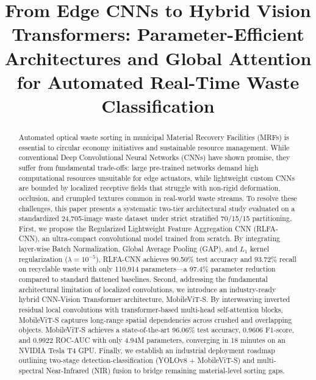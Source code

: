 \documentclass[conference]{IEEEtran}
\begin{document}
\title{From Edge CNNs to Hybrid Vision Transformers: Parameter-Efficient Architectures and Global Attention for Automated Real-Time Waste Classification\\
}

\author{
}

\maketitle

\begin{abstract}
Automated optical waste sorting in municipal Material Recovery Facilities (MRFs) is essential to circular economy initiatives and sustainable resource management. While conventional Deep Convolutional Neural Networks (CNNs) have shown promise, they suffer from fundamental trade-offs: large pre-trained networks demand high computational resources unsuitable for edge actuators, while lightweight custom CNNs are bounded by localized receptive fields that struggle with non-rigid deformation, occlusion, and crumpled textures common in real-world waste streams. To resolve these challenges, this paper presents a systematic two-tier architectural study evaluated on a standardized 24,705-image waste dataset under strict stratified 70/15/15 partitioning. First, we propose the Regularized Lightweight Feature Aggregation CNN (RLFA-CNN), an ultra-compact convolutional model trained from scratch. By integrating layer-wise Batch Normalization, Global Average Pooling (GAP), and $L_1$ kernel regularization ($\lambda = 10^{-5}$), RLFA-CNN achieves 90.50\% test accuracy and 93.72\% recall on recyclable waste with only 110,914 parameters---a 97.4\% parameter reduction compared to standard flattened baselines. Second, addressing the fundamental architectural limitation of localized convolutions, we introduce an industry-ready hybrid CNN-Vision Transformer architecture, MobileViT-S. By interweaving inverted residual local convolutions with transformer-based multi-head self-attention blocks, MobileViT-S captures long-range spatial dependencies across crushed and overlapping objects. MobileViT-S achieves a state-of-the-art 96.06\% test accuracy, 0.9606 F1-score, and 0.9922 ROC-AUC with only 4.94M parameters, converging in 18 minutes on an NVIDIA Tesla T4 GPU. Finally, we establish an industrial deployment roadmap outlining two-stage detection-classification (YOLOv8 + MobileViT-S) and multi-spectral Near-Infrared (NIR) fusion to bridge remaining material-level sorting gaps.
\end{abstract}
\end{document}
